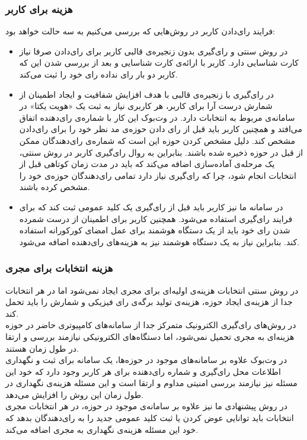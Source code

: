 \subsubsection{هزینه برای کاربر}
فرایند رای‌دادن کاربر در روش‌هایی که بررسی می‌کنیم به سه حالت خواهد بود:
\begin{itemize}
 \item 
 در روش‌ سنتی و رای‌گیری بدون زنجیره‌ی قالبی کاربر برای رای‌دادن صرفا نیاز کارت شناسایی دارد. کاربر با ارائه‌ی کارت شناسایی و بعد از بررسی شدن این که کاربر دو بار رای نداده رای خود را ثبت می‌کند. 
 \item 
 در رای‌گیری با زنجیره‌ی قالبی با هدف افزایش شفافیت و ایجاد اطمینان از شمارش درست آرا برای کاربر، هر کاربری نیاز به ثبت یک «هویت یکتا» در سامانه‌ی مربوط به انتخابات دارد. در وت‌بوک این کار با شماره‌ی رای‌‌دهنده اتفاق می‌افتد و همچنین کاربر باید قبل از رای‌ دادن حوزه‌ی مد نظر خود را برای رای‌دادن مشخص کند. دلیل مشخص کردن حوزه این است که شماره‌ی رای‌دهندگان ممکن از قبل در حوزه ذخیره شده باشند. بنابراین به روال رای‌گیری کاربر در روش سنتی، یک مرحله‌ی آماده‌سازی اضافه می‌کند که باید در مدت زمان کوتاهی قبل از انتخابات انجام شود، چرا که رای‌گیری نیاز دارد تمامی رای‌دهندگان حوزه‌ی خود را مشخص کرده باشند.
 
 \item
 در سامانه ما نیز کاربر باید قبل از رای‌گیری یک کلید عمومی ثبت کند که برای فرایند رای‌گیری استفاده می‌شود. همچنین کاربر برای اطمینان از درست شمرده شدن رای خود باید از یک دستگاه هوشمند برای عمل امضای کورکورانه استفاده کند. بنابراین نیاز به یک دستگاه هوشمند نیز به هزینه‌های رای‌دهنده اضافه می‌شود. 
\end{itemize}
\subsubsection{هزینه انتخابات برای مجری}
در روش سنتی انتخابات هزینه‌ی اولیه‌ای برای مجری ایجاد نمی‌شود اما در هر انتخابات جدا از هزینه‌ی ایجاد حوزه، هزینه‌ی تولید برگه‌ی رای فیزیکی و شمارش را باید تحمل کند. 
\\
در روش‌های رای‌گیری الکترونیک متمرکز جدا از سامانه‌های کامپیوتری حاضر در حوزه هزینه‌‌ای به مجری تحمیل نمی‌شود، اما دستگا‌ه‌های الکترونیکی نیازمند بررسی و ارتقا در طول زمان هستند.
\\
در وت‌بوک علاوه بر سامانه‌های موجود در حوزه‌ها، یک سامانه‌ برای ثبت و نگهداری اطلاعات محل رای‌گیری و شماره رای‌دهنده برای هر کاربر وجود دارد که خود این مسئله نیز نیازمند بررسی امنیتی مداوم و ارتقا است و این مسئله هزینه‌ی نگهداری در طول زمان این روش را افزایش می‌دهد. 
\\
در روش پیشنهادی ما نیز علاوه بر سامانه‌ی موجود در حوزه، در هر انتخابات مجری انتخابات باید توانایی عوض کردن یا ثبت کلید عمومی جدید را به رای‌دهندگان بدهد که خود این مسئله هزینه‌ی نگهداری به مجری اضافه می‌کند. 
